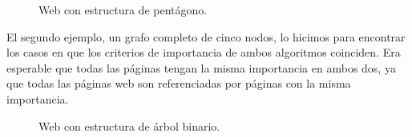 \begin{figure}[H]
\centering     %
{}
\caption{Web con estructura de pentágono.}
\end{figure}

El segundo ejemplo, un grafo completo de cinco nodos, lo hicimos para encontrar los casos en que los criterios de importancia de ambos algoritmos coinciden. Era esperable que todas las páginas tengan la misma importancia en ambos dos, ya que todas las páginas web son referenciadas por páginas con la misma importancia.

\begin{figure}[H]
\centering     %
{}
\caption{Web con estructura de árbol binario.}
\end{figure}


